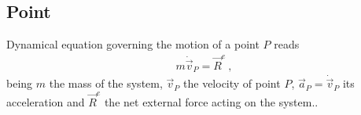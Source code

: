 \documentclass[letterpaper,10pt,english]{jupyterBook}
\begin{document}
\sphinxstepscope




\subsection{Point}
\label{\detokenize{ch/lagrange-point:point}}\label{\detokenize{ch/lagrange-point:classical-mechanics-lagrange-point}}\label{\detokenize{ch/lagrange-point::doc}}
\sphinxAtStartPar
{} Dynamical equation governing the motion of a point \(P\) reads
\begin{equation*}
\begin{split}m \dot{\vec{v}}_P = \vec{R}^e \ ,\end{split}
\end{equation*}
\sphinxAtStartPar
being \(m\) the mass of the system, \(\vec{v}_P\) the velocity of point \(P\), \(\vec{a}_P = \dot{\vec{v}}_P\) its acceleration and \(\vec{R}^{e}\) the net external force acting on the system..
\end{document}

